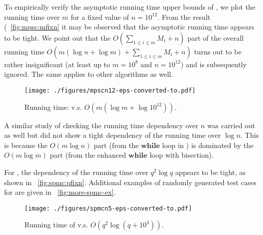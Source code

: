 To empirically verify the asymptotic running time upper bounds of 
\algoMRSimple, we plot the running time over $m$ for a fixed value of 
$n =10^{12}$. From the result (~\ref{fig:mpsc:mfixn} it may be 
observed that the asymptotic running time appears to be tight. We point
out that the $O(\sum_{1\le i \le m} M_i + n)$ part of the overall 
running time $O(m(\log n + \log m) + \sum_{1\le i \le m} M_i + n)$ turns 
out to be rather insignificant (at least up to $m = 10^8$ and $n = 10^12$) 
and is subsequently ignored. The same applies to other algorithms as 
well. 
\begin{figure}[ht!]
    \vspace*{-2mm}
    \centering
    \texttt{[image: ./figures/mpscn12-eps-converted-to.pdf]}
    \vspace*{-4mm}
    \caption{\label{fig:opg-mpsc:mfixn}Running time: \algoMRSimple 
		v.s. $O(m (\log m + \log 10^{12}))$.}
    \vspace*{-3mm}
\end{figure}

A similar study of checking the running time dependency over $n$ was 
carried out as well but did not show a tight dependency of the running 
time over $\log n$. This is because the $O(m\log n)$ part (from the 
$\mathbf{while}$ loop in \algoMRSimple) is dominated by the 
$O(m\log m)$ part (from the enhanced $\mathbf{while}$ loop with bisection). 

For \algoSRG, the dependency of the running time over $q^2\log q$ 
appears to be tight, as shown in ~\ref{fig:spmc:qfixn}. Additional 
examples of randomly generated test cases for \algoSRG are 
given in ~\ref{fig:more-spmc-ex}. 
\begin{figure}[ht!]
    \centering
    \texttt{[image: ./figures/spmcn5-eps-converted-to.pdf]}
    \vspace*{-4mm}
    \caption{\label{fig:opg-spmc:qfixn}Running time of \algoSRG 
		v.s. $O(q^2\log(q + 10^3))$.}
    \vspace*{-2mm}
\end{figure}

